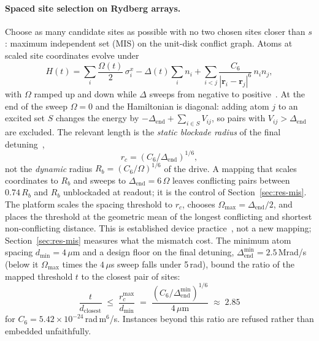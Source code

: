 \documentclass[11pt,a4paper]{article}
\begin{document}
\paragraph{Spaced site selection on Rydberg arrays.} Choose as many candidate
sites as possible with no two chosen sites closer than $s$: maximum independent
set (MIS) on the unit-disk conflict graph. Atoms at scaled site coordinates
evolve under
\begin{equation}
H(t) = \sum_i \frac{\Omega(t)}{2}\,\sigma^x_i - \Delta(t)\sum_i n_i
      + \sum_{i<j} \frac{C_6}{|\mathbf r_i - \mathbf r_j|^6}\, n_i n_j,
\end{equation}
with $\Omega$ ramped up and down while $\Delta$ sweeps from negative to
positive~\cite{pichler2018,ebadi2022}. At the end of the sweep $\Omega = 0$
and the Hamiltonian is diagonal: adding atom $j$ to an excited set $S$ changes
the energy by $-\Delta_{\mathrm{end}} + \sum_{i\in S} V_{ij}$, so pairs with
$V_{ij} > \Delta_{\mathrm{end}}$ are excluded. The relevant length is the
\emph{static blockade radius} of the final detuning~\cite{wurtz2023},
\begin{equation}
r_c = \left(C_6/\Delta_{\mathrm{end}}\right)^{1/6},
\end{equation}
not the \emph{dynamic} radius $R_b = (C_6/\Omega)^{1/6}$ of the drive. A
mapping that scales coordinates to $R_b$ and sweeps to
$\Delta_{\mathrm{end}} = 6\,\Omega$ leaves conflicting pairs between
$0.74\,R_b$ and $R_b$ unblockaded at readout; it is the control of
Section~\ref{sec:res-mis}. The platform scales the
spacing threshold to $r_c$, chooses $\Omega_{\max} = \Delta_{\mathrm{end}}/2$,
and places the threshold at the geometric mean of the longest conflicting and
shortest non-conflicting distance. This is established device
practice~\cite{wurtz2023}, not a new mapping; Section~\ref{sec:res-mis}
measures what the mismatch cost. The minimum atom spacing
$d_{\min} = 4\,\mu$m and a design floor on the final detuning,
$\Delta_{\mathrm{end}}^{\min} = 2.5$\,Mrad/s (below it $\Omega_{\max}$ times
the $4\,\mu$s sweep falls under 5\,rad), bound the ratio of the mapped
threshold $t$ to the closest pair of sites:
\begin{equation}
\frac{t}{d_{\mathrm{closest}}} \;\le\; \frac{r_c^{\max}}{d_{\min}}
\;=\; \frac{(C_6/\Delta_{\mathrm{end}}^{\min})^{1/6}}{4\,\mu\mathrm{m}}
\;\approx\; 2.85
\end{equation}
for $C_6 = 5.42\times 10^{-24}$\,rad\,m$^6$/s. Instances beyond this ratio are
refused rather than embedded unfaithfully.
\end{document}
